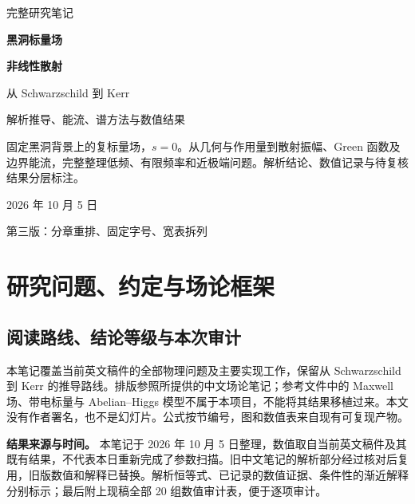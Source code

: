 \documentclass[UTF8,fontset=fandol,12pt,a4paper,oneside,openany]{ctexrep}
\begin{document}
\hypersetup{pageanchor=false}
\begin{titlepage}\centering\vspace*{18mm}
{\small\color{ink} 完整研究笔记\par}\vspace{14mm}
{\Huge\bfseries 黑洞标量场\par}\vspace{5mm}
{\Huge\bfseries 非线性散射\par}\vspace{10mm}
{\LARGE 从 Schwarzschild 到 Kerr\par}\vspace{8mm}
{\large 解析推导、能流、谱方法与数值结果\par}\vspace{16mm}
\begin{minipage}{0.88\textwidth}\begin{note}
固定黑洞背景上的复标量场，$s=0$。从几何与作用量到散射振幅、Green 函数及边界能流，完整整理低频、有限频率和近极端问题。解析结论、数值记录与待复核结果分层标注。
\end{note}\end{minipage}
\vfill{\large 2026 年 10 月 5 日\par}\vspace{5mm}
{\small 第三版：分章重排、固定字号、宽表拆列\par}
\end{titlepage}
\hypersetup{pageanchor=true}
\tableofcontents\clearpage{}
\chapter{研究问题、约定与场论框架}
\section{阅读路线、结论等级与本次审计}
本笔记覆盖当前英文稿件的全部物理问题及主要实现工作，保留从 Schwarzschild 到 Kerr 的推导路线。排版参照所提供的中文场论笔记；参考文件中的 Maxwell 场、带电标量与 Abelian--Higgs 模型不属于本项目，不能将其结果移植过来。本文没有作者署名，也不是幻灯片。公式按节编号，图和数值表来自现有可复现产物。

\begin{note}
\textbf{结果来源与时间。} 本笔记于 2026 年 10 月 5 日整理，数值取自当前英文稿件及其既有结果，不代表本日重新完成了参数扫描。旧中文笔记的解析部分经过核对后复用，旧版数值和解释已替换。解析恒等式、已记录的数值证据、条件性的渐近解释分别标示；最后附上现稿全部 20 组数值审计表，便于逐项审计。
\end{note}
\end{document}
